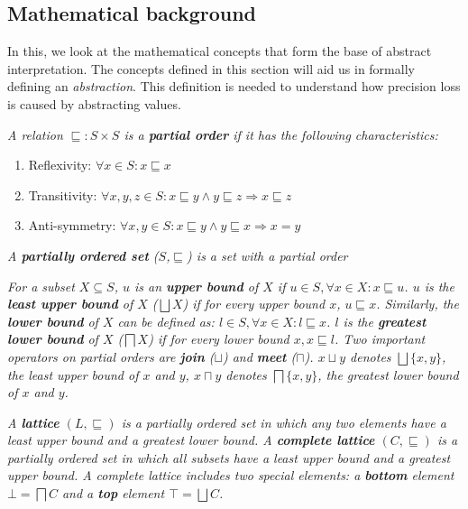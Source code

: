\subsection{Mathematical background}
\label{subsec:lattice}

In this, we look at the mathematical concepts that form the base of abstract interpretation. The concepts defined in this section will aid us in formally defining an \textit{abstraction}. This definition is needed to understand how precision loss is caused by abstracting values.

\begin{definition}
\textit{A relation $\sqsubseteq: S \times S$ is a \textbf{partial order} if it has the following characteristics:}
\begin{enumerate}
\item Reflexivity: $\forall x \in S : x \sqsubseteq x$
\item Transitivity:  $\forall x,y,z \in S : x \sqsubseteq y \wedge y \sqsubseteq z \Rightarrow x \sqsubseteq z$
\item Anti-symmetry: $\forall x,y \in S : x \sqsubseteq y \wedge y \sqsubseteq x \Rightarrow x = y$
\end{enumerate}
\end{definition}
\begin{definition}
\textit{A \textbf{partially ordered set} ($S$,$\sqsubseteq$) is a set with a partial order}
\end{definition}
\begin{definition}
\textit{For a subset $X \subseteq S$, $u$ is an \textbf{upper bound} of $X$ if $u\in S, \forall x \in X: x \sqsubseteq u$. $u$ is the \textbf{least upper bound} of $X$ ($\bigsqcup X$) if for every upper bound $x$, $u \sqsubseteq x$. Similarly, the \textbf{lower bound} of $X$ can be defined as: $l \in S,\forall x \in X: l \sqsubseteq x$. $l$ is the \textbf{greatest lower bound} of $X$ ($\bigsqcap X$) if for every lower bound $x, x \sqsubseteq l$. Two important operators on partial orders are \textbf{join} ($\sqcup$) and \textbf{meet} ($\sqcap$). $x \sqcup y$ denotes $\bigsqcup\{x,y\}$, the least upper bound of $x$ and $y$, $x \sqcap y$ denotes $\bigsqcap\{x,y\}$, the greatest lower bound of $x$ and $y$.}
\end{definition}

\begin{definition}\label{def:lattice}
\textit{A \textbf{lattice} $(L,\sqsubseteq)$ is a partially ordered set in which any two elements have a least upper bound and a greatest lower bound. A \textbf{complete lattice} $(C,\sqsubseteq)$ is a partially ordered set in which all subsets have a least upper bound and a greatest upper bound. A complete lattice includes two special elements: a \textbf{bottom} element $\bot = \bigsqcap C$ and a \textbf{top} element $\top = \bigsqcup C$.}
\end{definition}

